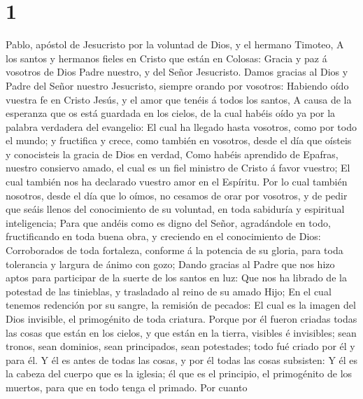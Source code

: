 \hypertarget{section}{%
\section{1}\label{section}}

 Pablo, apóstol de Jesucristo por la voluntad de Dios, y
el hermano Timoteo,  A los santos y hermanos fieles en
Cristo que están en Colosas: Gracia y paz á vosotros de Dios Padre
nuestro, y del Señor Jesucristo.  Damos gracias al Dios y
Padre del Señor nuestro Jesucristo, siempre orando por vosotros:
 Habiendo oído vuestra fe en Cristo Jesús, y el amor que
tenéis á todos los santos,  A causa de la esperanza que os
está guardada en los cielos, de la cual habéis oído ya por la palabra
verdadera del evangelio:  El cual ha llegado hasta
vosotros, como por todo el mundo; y fructifica y crece, como también en
vosotros, desde el día que oísteis y conocisteis la gracia de Dios en
verdad,  Como habéis aprendido de Epafras, nuestro
consiervo amado, el cual es un fiel ministro de Cristo á favor vuestro;
 El cual también nos ha declarado vuestro amor en el
Espíritu.  Por lo cual también nosotros, desde el día que
lo oímos, no cesamos de orar por vosotros, y de pedir que seáis llenos
del conocimiento de su voluntad, en toda sabiduría y espiritual
inteligencia;  Para que andéis como es digno del Señor,
agradándole en todo, fructificando en toda buena obra, y creciendo en el
conocimiento de Dios:  Corroborados de toda fortaleza,
conforme á la potencia de su gloria, para toda tolerancia y largura de
ánimo con gozo;  Dando gracias al Padre que nos hizo
aptos para participar de la suerte de los santos en luz: 
Que nos ha librado de la potestad de las tinieblas, y trasladado al
reino de su amado Hijo;  En el cual tenemos redención por
su sangre, la remisión de pecados:  El cual es la imagen
del Dios invisible, el primogénito de toda criatura. 
Porque por él fueron criadas todas las cosas que están en los cielos, y
que están en la tierra, visibles é invisibles; sean tronos, sean
dominios, sean principados, sean potestades; todo fué criado por él y
para él.  Y él es antes de todas las cosas, y por él
todas las cosas subsisten:  Y él es la cabeza del cuerpo
que es la iglesia; él que es el principio, el primogénito de los
muertos, para que en todo tenga el primado.  Por cuanto
